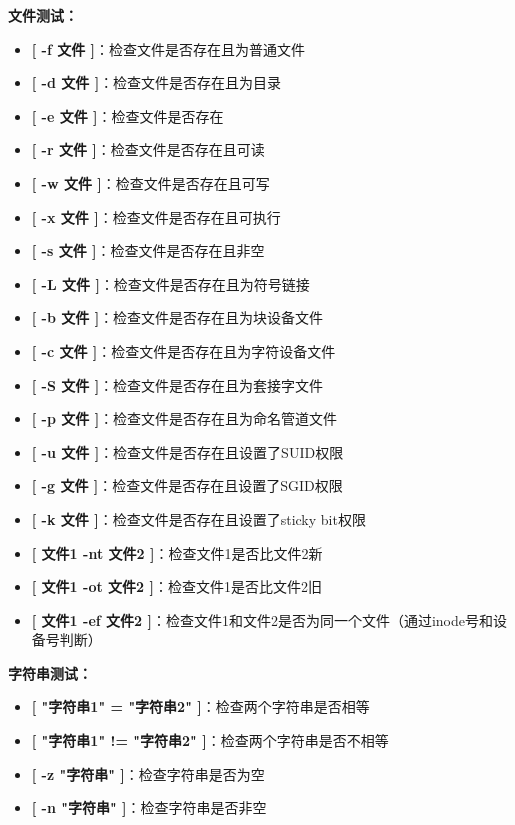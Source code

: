 \documentclass[12pt,UTF8]{ctexbook}
\begin{document}
\textbf{文件测试：}
\begin{itemize}
    \item \textbf{[ -f 文件 ]}：检查文件是否存在且为普通文件
    \item \textbf{[ -d 文件 ]}：检查文件是否存在且为目录
    \item \textbf{[ -e 文件 ]}：检查文件是否存在
    \item \textbf{[ -r 文件 ]}：检查文件是否存在且可读
    \item \textbf{[ -w 文件 ]}：检查文件是否存在且可写
    \item \textbf{[ -x 文件 ]}：检查文件是否存在且可执行
    \item \textbf{[ -s 文件 ]}：检查文件是否存在且非空
    \item \textbf{[ -L 文件 ]}：检查文件是否存在且为符号链接
    \item \textbf{[ -b 文件 ]}：检查文件是否存在且为块设备文件
    \item \textbf{[ -c 文件 ]}：检查文件是否存在且为字符设备文件
    \item \textbf{[ -S 文件 ]}：检查文件是否存在且为套接字文件
    \item \textbf{[ -p 文件 ]}：检查文件是否存在且为命名管道文件
    \item \textbf{[ -u 文件 ]}：检查文件是否存在且设置了SUID权限
    \item \textbf{[ -g 文件 ]}：检查文件是否存在且设置了SGID权限
    \item \textbf{[ -k 文件 ]}：检查文件是否存在且设置了sticky bit权限
    \item \textbf{[ 文件1 -nt 文件2 ]}：检查文件1是否比文件2新
    \item \textbf{[ 文件1 -ot 文件2 ]}：检查文件1是否比文件2旧
    \item \textbf{[ 文件1 -ef 文件2 ]}：检查文件1和文件2是否为同一个文件（通过inode号和设备号判断）
\end{itemize}

\textbf{字符串测试：}
\begin{itemize}
    \item \textbf{[ "字符串1" = "字符串2" ]}：检查两个字符串是否相等
    \item \textbf{[ "字符串1" != "字符串2" ]}：检查两个字符串是否不相等
    \item \textbf{[ -z "字符串" ]}：检查字符串是否为空
    \item \textbf{[ -n "字符串" ]}：检查字符串是否非空
\end{itemize}
\end{document}
